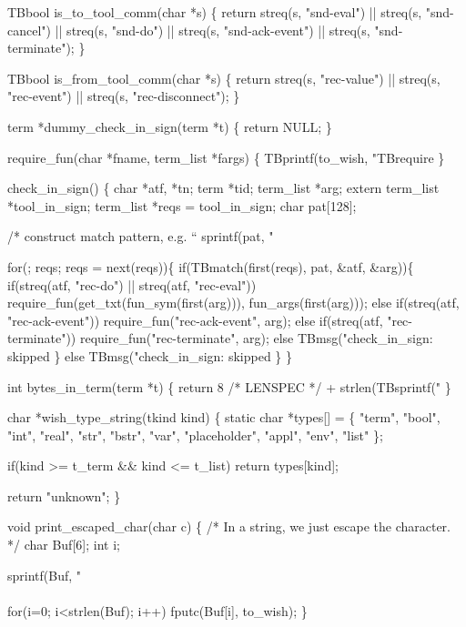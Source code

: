 TBbool is_to_tool_comm(char *s)
\{
  return streq(s, "snd-eval") || streq(s, "snd-cancel") || 
    streq(s, "snd-do") || streq(s, "snd-ack-event") ||
    streq(s, "snd-terminate");
\}

TBbool is_from_tool_comm(char *s)
\{
  return streq(s, "rec-value") ||  streq(s, "rec-event") || streq(s, "rec-disconnect");
\}

term *dummy_check_in_sign(term *t)
\{
  return NULL;
\}

require_fun(char *fname, term_list *fargs)
\{
  TBprintf(to_wish, "TBrequire %
\}

check_in_sign()
\{ char *atf, *tn;
  term *tid;
  term_list *arg;
  extern term_list *tool_in_sign;
  term_list *reqs = tool_in_sign;
  char pat[128];

  /* construct match pattern, e.g. ``%
  sprintf(pat, "%

  for(; reqs; reqs = next(reqs))\{
    if(TBmatch(first(reqs), pat, &atf, &arg))\{
        if(streq(atf, "rec-do") || streq(atf, "rec-eval"))
          require_fun(get_txt(fun_sym(first(arg))), fun_args(first(arg)));
        else if(streq(atf, "rec-ack-event"))
          require_fun("rec-ack-event", arg);
        else if(streq(atf, "rec-terminate"))
          require_fun("rec-terminate", arg);
        else
          TBmsg("check_in_sign: skipped %
  \} else
        TBmsg("check_in_sign: skipped %
  \}
\}

int bytes_in_term(term *t)
\{
  return 8 /* LENSPEC */ + strlen(TBsprintf("%
\}

char *wish_type_string(tkind kind)
\{
  static char *types[] =
    \{ "term", "bool", "int", "real", "str", "bstr", "var",
      "placeholder", "appl", "env", "list"
    \};

  if(kind >= t_term && kind <= t_list)
    return types[kind];

  return "unknown";
\}

void print_escaped_char(char c)
\{
  /* In a string, we just escape the character. */
  char Buf[6];
  int i;
  
  sprintf(Buf, "\\\\%
  for(i=0; i<strlen(Buf); i++)
    fputc(Buf[i], to_wish);
\}

